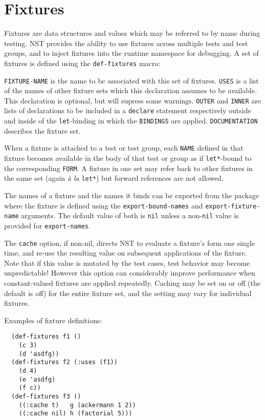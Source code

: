\section{Fixtures}
\label{fixtures}
Fixtures are data structures and values which may be
referred to by name during testing.  NST provides the ability to use
fixtures across multiple tests and test groups, and to inject fixtures
into the runtime namespace for debugging.
A set of fixtures is defined using the \texttt{def-fixtures}
macro:

%
\texttt{FIXTURE-NAME} is the name to be associated with this set of
fixtures.  \texttt{USES} is a list of the names of other fixture sets
which this declaration assumes to be available.  This declaration is
optional, but will supress some warnings.  \texttt{OUTER} and
\texttt{INNER} are lists of declarations to be included in a
\texttt{declare} statement respectively outside and inside of the
\texttt{let}-binding in which the \texttt{BINDINGS} are applied.
\texttt{DOCUMENTATION} describes the fixture set.

When a fixture is attached to a test or test group, each \texttt{NAME}
defined in that fixture becomes available in the body of that test or
group as if \texttt{let*}-bound to the corresponding \texttt{FORM}.  A
fixture in one set may refer back to other fixtures in the same set
(again \emph{\`a la} \texttt{let*}) but forward references are not
allowed.

The names of a fixture and the names it binds can be exported from the
package where the fixture is defined using the
\texttt{export-bound-names} and \texttt{export-fixture-name}
arguments.  The default value of both is \texttt{nil} unless a
non-\texttt{nil} value is provided for \texttt{export-names}.

The \texttt{cache} option, if non-nil, directs NST to evaluate a
fixture's form one single time, and re-use the resulting value on
subsequent applications of the fixture.  Note that if this value is
mutated by the test cases, test behavior may become unpredictable!
However this option can considerably improve performance when
constant-valued fixtures are applied repeatedly.  Caching may be set
on or off (the default is off) for the entire fixture set, and the
setting may vary for individual fixtures.

Examples of fixture definitions:
\begin{verbatim}
  (def-fixtures f1 ()
    (c 3)
    (d 'asdfg))
  (def-fixtures f2 (:uses (f1))
    (d 4)
    (e 'asdfg)
    (f c))
  (def-fixtures f3 ()
    ((:cache t)   g (ackermann 1 2))
    ((:cache nil) h (factorial 5)))
\end{verbatim}

